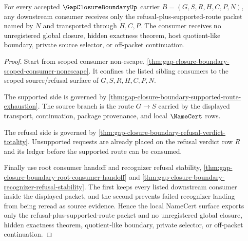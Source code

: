 \begin{theorem}
\label{thm:gap-closure-boundary-namecert-consumer-nonescape}
For every accepted $\GapClosureBoundaryUp$ carrier $B=(G,S,R,H,C,P,N)$, any downstream consumer receives only the refusal-plus-supported-route packet named by $N$ and transported through $H,C,P$. The consumer receives no unregistered global closure, hidden exactness theorem, host quotient-like boundary, private source selector, or off-packet continuation.
\end{theorem}
\begin{proof}
Start from scoped consumer non-escape, \autoref{thm:gap-closure-boundary-scoped-consumer-nonescape}. It confines the listed sibling consumers to the scoped source/refusal surface of $G,S,R,H,C,P,N$.

The supported side is governed by \autoref{thm:gap-closure-boundary-supported-route-exhaustion}. The source branch is the route $G \longrightarrow S$ carried by the displayed transport, continuation, package provenance, and local $\NameCert$ rows.

The refusal side is governed by \autoref{thm:gap-closure-boundary-refusal-verdict-totality}. Unsupported requests are already placed on the refusal verdict row $R$ and its ledger before the supported route can be consumed.

Finally use root consumer handoff and recognizer refusal stability, \autoref{thm:gap-closure-boundary-root-consumer-handoff} and \autoref{thm:gap-closure-boundary-recognizer-refusal-stability}. The first keeps every listed downstream consumer inside the displayed packet, and the second prevents failed recognizer landing from being reread as source evidence. Hence the local NameCert surface exports only the refusal-plus-supported-route packet and no unregistered global closure, hidden exactness theorem, quotient-like boundary, private selector, or off-packet continuation.
\end{proof}
